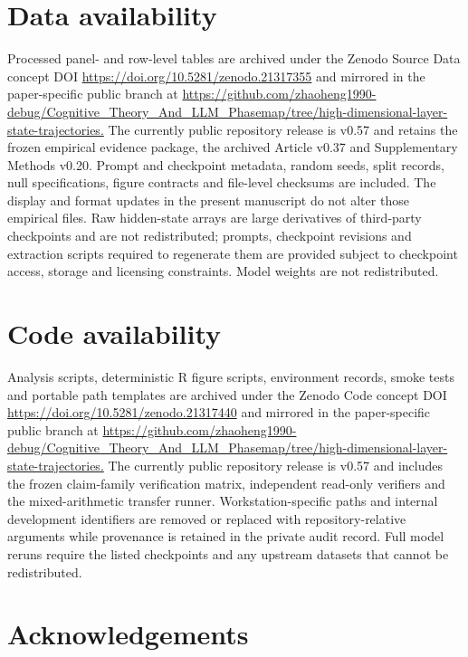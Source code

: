 \documentclass[12pt]{article}
\begin{document}
\section*{Data availability}

Processed panel- and row-level tables are archived under the Zenodo Source Data concept DOI \url{https://doi.org/10.5281/zenodo.21317355} and mirrored in the paper-specific public branch at \url{https://github.com/zhaoheng1990-debug/Cognitive_Theory_And_LLM_Phasemap/tree/high-dimensional-layer-state-trajectories.} The currently public repository release is v0.57 and retains the frozen empirical evidence package, the archived Article v0.37 and Supplementary Methods v0.20. Prompt and checkpoint metadata, random seeds, split records, null specifications, figure contracts and file-level checksums are included. The display and format updates in the present manuscript do not alter those empirical files. Raw hidden-state arrays are large derivatives of third-party checkpoints and are not redistributed; prompts, checkpoint revisions and extraction scripts required to regenerate them are provided subject to checkpoint access, storage and licensing constraints. Model weights are not redistributed.

\section*{Code availability}

Analysis scripts, deterministic R figure scripts, environment records, smoke tests and portable path templates are archived under the Zenodo Code concept DOI \url{https://doi.org/10.5281/zenodo.21317440} and mirrored in the paper-specific public branch at \url{https://github.com/zhaoheng1990-debug/Cognitive_Theory_And_LLM_Phasemap/tree/high-dimensional-layer-state-trajectories.} The currently public repository release is v0.57 and includes the frozen claim-family verification matrix, independent read-only verifiers and the mixed-arithmetic transfer runner. Workstation-specific paths and internal development identifiers are removed or replaced with repository-relative arguments while provenance is retained in the private audit record. Full model reruns require the listed checkpoints and any upstream datasets that cannot be redistributed.

\section*{Acknowledgements}
\end{document}
